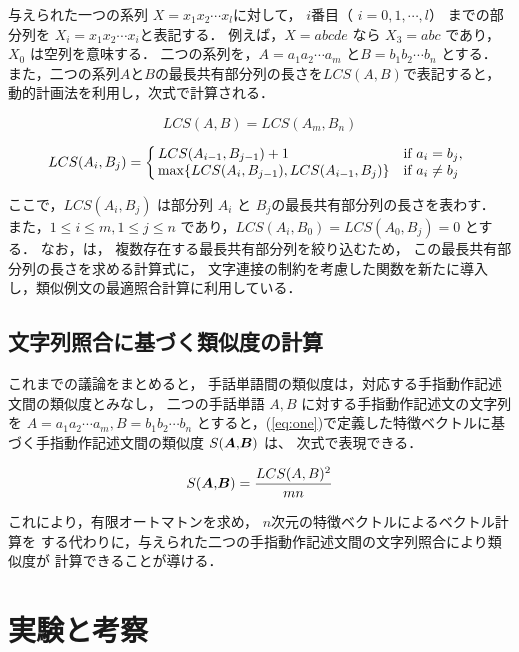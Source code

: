 与えられた一つの系列 $X=x_1x_2 \cdots x_l$に対して，
$i$番目（ $i=0,1,\cdots,l$）
までの部分列を $X_i=x_1x_2\cdots x_i$と表記する．
例えば，$X=abcde$ なら $X_3=abc$ であり，$X_0$ は空列を意味する．
二つの系列を，$A=a_1a_2\cdots a_m$ と$B=b_1b_2\cdots b_n$ とする．
また，二つの系列$A$と$B$の最長共有部分列の長さを$LCS(A,B)$で表記すると，
動的計画法を利用し，次式で計算される．

\begin{equation}
LCS ( A, B ) = LCS ( A_m, B_n )
\end{equation}

\[ LCS(A_i,B_j) = \left\{
	\begin{array}{@{\,}ll}
	LCS(A_{i-1},B_{j-1})+1 & \mbox{if $a_i = b_j$,}\\
	\max \{LCS(A_i,B_{j-1}),LCS(A_{i-1},B_j) \} & \mbox{if $a_i \neq b_j$}
	\end{array}
	\right. 
\]

ここで，$LCS(A_i,B_j)$ は部分列 $A_i$ と $B_j$の最長共有部分列の長さを表わす．
また，$1 \le i \le m, 1 \le j \le n$ であり，$LCS(A_i,B_0) = LCS(A_0,B_j) = 0$ とする．
なお，\cite{SatoSatoshi1992}は，
複数存在する最長共有部分列を絞り込むため，
この最長共有部分列の長さを求める計算式に，
文字連接の制約を考慮した関数を新たに導入し，類似例文の最適照合計算に利用している．

\subsection {文字列照合に基づく類似度の計算}

これまでの議論をまとめると，
手話単語間の類似度は，対応する手指動作記述文間の類似度とみなし，
二つの手話単語 $A, B$ に対する手指動作記述文の文字列を
$A = a_1 a_2 \cdots a_m, B = b_1 b_2 \cdots b_n$ とすると，(\ref{eq:one})で定義した特徴ベクトルに基づく手指動作記述文間の類似度 $S(\mbox{\boldmath $A$,$B$})$ は、
次式で表現できる．

\begin{equation}
\label{sim}
S(\mbox{\boldmath $A$,$B$}) = \frac{LCS(A,B)^2}{mn}
\end{equation}

これにより，有限オートマトンを求め，
$n$次元の特徴ベクトルによるベクトル計算を
する代わりに，与えられた二つの手指動作記述文間の文字列照合により類似度が
計算できることが導ける．

\section {実験と考察}

